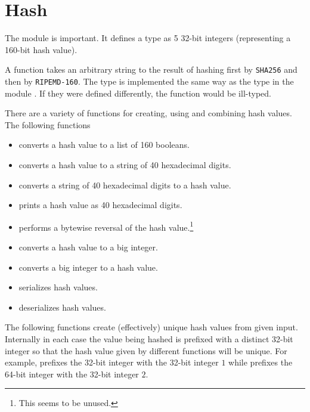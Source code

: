 \section{Hash}

The module {} is important. It defines a type {} as 5 32-bit integers (representing a 160-bit hash value).

A function {} takes an arbitrary string to the result of hashing first by {\tt{SHA256}} and then by {\tt{RIPEMD-160}}.
The type {} is implemented the same way as the type {} in the module {}. If they were defined differently, the function {} would be ill-typed.

There are a variety of functions for creating, using and combining hash values.
The following functions 
\begin{itemize}
\item {} converts a hash value to a list of 160 booleans.
\item {} converts a hash value to a string of 40 hexadecimal digits.
\item {} converts a string of 40 hexadecimal digits to a hash value.
\item {} prints a hash value as 40 hexadecimal digits.
\item {} performs a bytewise reversal of the hash value.\footnote{This seems to be unused.}
\item {} converts a hash value to a big integer.
\item {} converts a big integer to a hash value.
\item {} serializes hash values.
\item {} deserializes hash values.
\end{itemize}
The following functions create (effectively) unique hash values from given input.
Internally in each case the value being hashed is prefixed with a distinct 32-bit
integer so that the hash value given by different functions will be unique.
For example, {} prefixes the 32-bit integer with the 32-bit integer $1$
while {} prefixes the 64-bit integer with the 32-bit integer $2$.
